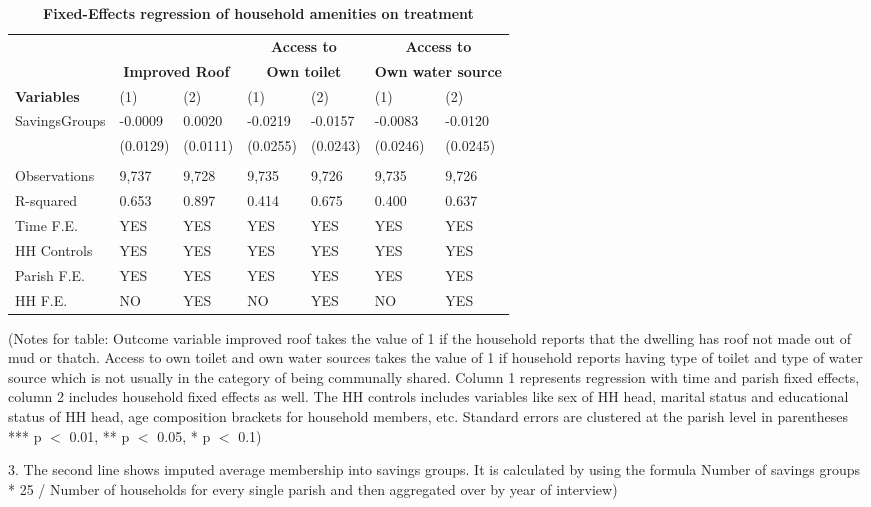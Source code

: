 \begin{table}[!h]
\centering
\begin{tabular}{lllllll}
 \\
&  & & \multicolumn{2}{c}{\bfseries Access to} &   \multicolumn{2}{c}{\bfseries Access to} \\
&  \multicolumn{2}{c}{\bfseries  Improved Roof}  & \multicolumn{2}{c}{\bfseries Own toilet} &   \multicolumn{2}{c}{\bfseries Own water source} \\
\cline{1-7}
 {\bfseries Variables} & (1) & (2)  & (1) & (2) & (1) & (2)
 &  \\
 \hline
SavingsGroups  & -0.0009 &	0.0020
 & -0.0219	& -0.0157 & -0.0083 &	-0.0120
 \\
  & (0.0129)	& (0.0111) & (0.0255) &	(0.0243)
& (0.0246)	& (0.0245)
 \\
 &  \\
Observations & 9,737	& 9,728	& 9,735	& 9,726 & 9,735	& 9,726
 \\
R-squared & 0.653	& 0.897	& 0.414	& 0.675 & 0.400	& 0.637 \\
Time F.E. & YES & YES & YES & YES & YES & YES\\
HH Controls & YES & YES & YES & YES & YES & YES\\
Parish F.E. & YES & YES  & YES & YES & YES & YES \\
HH F.E.  & NO & YES  & NO & YES & NO & YES \\ \hline
\cline{1-7}
\end{tabular}
\caption{\bfseries Fixed-Effects regression of household amenities on treatment}
\footnotesize{(Notes for table: Outcome variable improved roof takes the value of 1 if the household reports that the dwelling has roof not made out of mud or thatch. Access to own toilet and own water sources takes the value of 1 if household reports having type of toilet and type of water source which is not usually in the category of being communally shared. Column 1 represents regression with time and parish fixed effects, column 2 includes household fixed effects as well. The HH controls includes variables like sex of HH head, marital status and educational status of HH head, age composition brackets for household members, etc. Standard errors are clustered at the parish level in parentheses\\
*** p $<$ 0.01, ** p $<$ 0.05, * p $<$ 0.1)} 
\end{table}





3. The second line shows imputed average membership into savings groups. It is calculated by using the formula Number of savings groups * 25 / Number of households for every single parish and then aggregated over by year of interview)